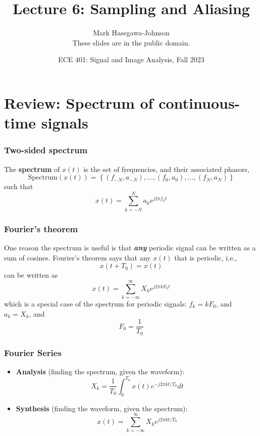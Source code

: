 \documentclass{beamer}
\title{Lecture 6: Sampling and Aliasing}
\author{Mark Hasegawa-Johnson\\These slides are in the public domain.}
\date{ECE 401: Signal and Image Analysis, Fall 2023}
\begin{document}
\begin{frame}
  \maketitle
\end{frame}

\begin{frame}
  \tableofcontents
\end{frame}

\section[Review]{Review: Spectrum of continuous-time signals}
\setcounter{subsection}{1}

\begin{frame}
  \frametitle{Two-sided spectrum}

  The {\bf spectrum} of $x(t)$ is the set of frequencies, and their
  associated phasors,
  \[
  \mbox{Spectrum}\left( x(t) \right) =
  \left\{ (f_{-N},a_{-N}), \ldots, (f_0,a_0), \ldots, (f_N,a_N) \right\}
  \]
  such that
  \[
  x(t) = \sum_{k=-N}^N a_ke^{j2\pi f_kt}
  \]
\end{frame}

\begin{frame}
  \frametitle{Fourier's theorem}

  One reason the spectrum is useful is that {\bf\em any} periodic
  signal can be written as a sum of cosines.  Fourier's theorem says that
  any $x(t)$ that is periodic, i.e.,
  \[
  x(t+T_0) = x(t)
  \]
  can be written as
  \[
  x(t) = \sum_{k=-\infty}^\infty X_k e^{j2\pi k F_0 t}
  \]
  which is a special case of the spectrum for periodic signals:
  $f_k=kF_0$, and $a_k=X_k$, and
  \[
  F_0 = \frac{1}{T_0}
  \]
\end{frame}

\begin{frame}
  \frametitle{Fourier Series}

  \begin{itemize}
  \item {\bf Analysis}  (finding the spectrum, given the waveform):
    \[
    X_k = \frac{1}{T_0}\int_0^{T_0} x(t)e^{-j2\pi kt/T_0}dt
    \]
  \item {\bf Synthesis} (finding the waveform, given the spectrum):
    \[
    x(t) = \sum_{k=-\infty}^\infty X_k e^{j2\pi kt/T_0}
    \]
  \end{itemize}
\end{frame}  
\end{document}
